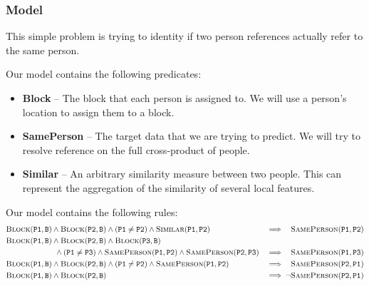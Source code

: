 \documentclass{article}
\begin{document}
        \subsubsection{Model}
            This simple problem is trying to identity if two person references actually refer to the same person.
            
            Our model contains the following predicates:
            \begin{itemize}
            \item \textbf{Block} --
               The block that each person is assigned to.
               We will use a person's location to assign them to a block.
            \item \textbf{SamePerson} --
               The target data that we are trying to predict.
               We will try to resolve reference on the full cross-product of people.
            \item \textbf{Similar} --
               An arbitrary similarity measure between two people.
               This can represent the aggregation of the similarity of several local features.
            \end{itemize}
            
            Our model contains the following rules:
            \begin{eqnarray}
            \begin{aligned}
               & \pslpred{Block}(\pslarg{P1}, \pslarg{B}) \psland \pslpred{Block}(\pslarg{P2}, \pslarg{B}) \psland (\pslarg{P1} \neq \pslarg{P2}) \psland \pslpred{Similar}(\pslarg{P1}, \pslarg{P2}) & \implies \ \ \pslpred{SamePerson}(\pslarg{P1}, \pslarg{P2}) \\ \nonumber
               & \pslpred{Block}(\pslarg{P1}, \pslarg{B}) \psland \pslpred{Block}(\pslarg{P2}, \pslarg{B}) \psland \pslpred{Block}(\pslarg{P3}, \pslarg{B}) \\ \nonumber 
               & \ \ \ \ \ \ \ \ \ \ \ \ \ \ \ \ \ \ \  \psland (\pslarg{P1} \neq \pslarg{P3}) \psland  \pslpred{SamePerson}(\pslarg{P1}, \pslarg{P2}) \psland \pslpred{SamePerson}(\pslarg{P2}, \pslarg{P3}) & \implies \ \ \pslpred{SamePerson}(\pslarg{P1}, \pslarg{P3})  \\ \nonumber
               & \pslpred{Block}(\pslarg{P1}, \pslarg{B}) \psland \pslpred{Block}(\pslarg{P2}, \pslarg{B}) \psland (\pslarg{P1} \neq \pslarg{P2}) \psland \pslpred{SamePerson}(\pslarg{P1}, \pslarg{P2}) & \implies \ \ \pslpred{SamePerson}(\pslarg{P2}, \pslarg{P1})  \\ \nonumber
               & \pslpred{Block}(\pslarg{P1}, \pslarg{B}) \psland \pslpred{Block}(\pslarg{P2}, \pslarg{B}) & \implies \pslneg \pslpred{SamePerson}(\pslarg{P2}, \pslarg{P1})
            \end{aligned}
            \end{eqnarray}
    
\end{document}
